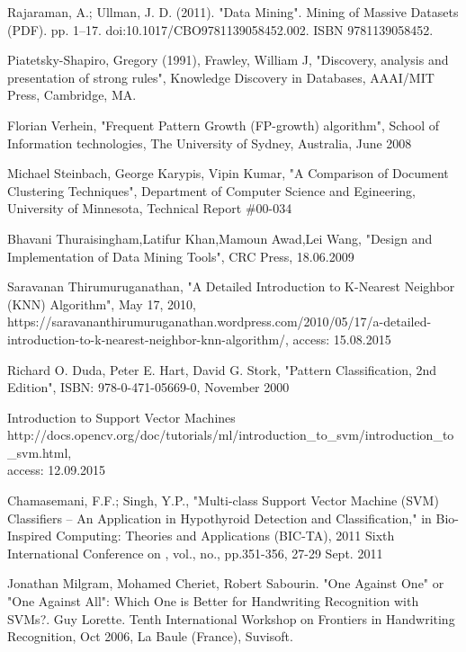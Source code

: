 \begin{thebibliography}{99}
Rajaraman, A.; Ullman, J. D. (2011). "Data Mining". Mining of Massive Datasets (PDF). pp. 1–17. doi:10.1017/CBO9781139058452.002. ISBN 9781139058452.

Piatetsky-Shapiro, Gregory (1991), Frawley, William J, "Discovery, analysis and presentation of strong rules", Knowledge Discovery in Databases, AAAI/MIT Press, Cambridge, MA.


Florian Verhein, "Frequent Pattern Growth (FP-growth) algorithm", School of Information technologies, The University of Sydney, Australia, June 2008

Michael Steinbach, George Karypis, Vipin Kumar, "A Comparison of Document Clustering Techniques", Department of Computer Science and Egineering,  University of Minnesota, Technical Report \#00-034 

Bhavani Thuraisingham,Latifur Khan,Mamoun Awad,Lei Wang, "Design and Implementation of Data Mining Tools", CRC Press, 18.06.2009

Saravanan Thirumuruganathan, "A Detailed Introduction to K-Nearest Neighbor (KNN) Algorithm", May 17, 2010, https://saravananthirumuruganathan.wordpress.com/2010/05/17/a-detailed-introduction-to-k-nearest-neighbor-knn-algorithm/, access: 15.08.2015

Richard O. Duda, Peter E. Hart, David G. Stork, "Pattern Classification, 2nd Edition", ISBN: 978-0-471-05669-0, November 2000

Introduction to Support Vector Machines \\ http://docs.opencv.org/doc/tutorials/ml/introduction\_to\_svm/introduction\_to\_svm.html,\\
access: 12.09.2015

Chamasemani, F.F.; Singh, Y.P., "Multi-class Support Vector Machine (SVM) Classifiers -- An Application in Hypothyroid Detection and Classification," in Bio-Inspired Computing: Theories and Applications (BIC-TA), 2011 Sixth International Conference on , vol., no., pp.351-356, 27-29 Sept. 2011

Jonathan Milgram, Mohamed Cheriet, Robert Sabourin. "One Against One" or "One Against
All": Which One is Better for Handwriting Recognition with SVMs?. Guy Lorette. Tenth
International Workshop on Frontiers in Handwriting Recognition, Oct 2006, La Baule (France),
Suvisoft.


\end{thebibliography}
